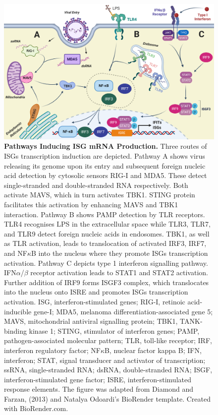 \begin{figure}
    \centering
    \includegraphics[width=1\linewidth]{04. Introduction//Figs/IFIT transcription activation figure.png}
    \caption[Pathways Inducing ISG mRNA Production.]{\textbf{Pathways Inducing ISG mRNA Production.} Three routes of ISGs transcription induction are depicted. Pathway A shows virus releasing its genome upon its entry and subsequent foreign nucleic acid detection by cytosolic sensors RIG-I and MDA5. These detect single-stranded and double-stranded RNA respectively. Both activate MAVS, which in turn activates TBK1. STING protein facilitates this activation by enhancing MAVS and TBK1 interaction. Pathway B shows PAMP detection by TLR receptors. TLR4 recognises LPS in the extracellular space while TLR3, TLR7, and TLR9 detect foreign nucleic acids in endosomes. TBK1, as well as TLR activation, leads to translocation of activated IRF3, IRF7, and NF\(\kappa\)B into the nucleus where they promote ISGs transcription activation. Pathway C depicts type 1 interferon signalling pathway. IFN\(\alpha\)/\(\beta\) receptor activation leads to STAT1 and STAT2 activation. Further addition of IRF9 forms ISGF3 complex, which translocates into the nucleus onto ISRE and promotes ISGs transcription activation. ISG, interferon-stimulated genes; RIG-I, retinoic acid-inducible gene-I; MDA5, melanoma differentiation-associated gene 5; MAVS, mitochondrial antiviral signalling protein; TBK1, TANK-binding kinase 1; STING, stimulator of interferon genes; PAMP, pathogen-associated molecular pattern; TLR, toll-like receptor; IRF, interferon regulatory factor; NF\(\kappa\)B, nuclear factor kappa B; IFN, interferon; STAT, signal transducer and activator of transcription; ssRNA, single-stranded RNA; dsRNA, double-stranded RNA; ISGF, interferon-stimulated gene factor; ISRE, interferon-stimulated response elements. The figure was adapted from Diamond and Farzan, (2013) and Natalya Odoardi’s BioRender template. Created with BioRender.com.}
    \label{fig:Pathways Inducing ISG mRNA Production.}
\end{figure}





